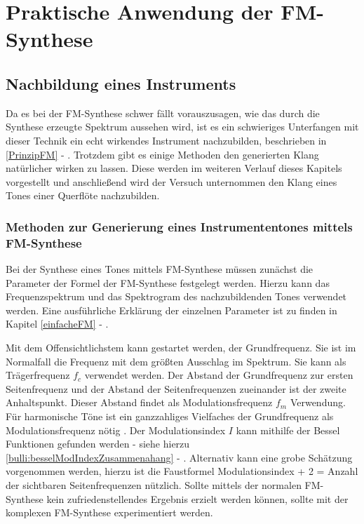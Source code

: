 \section{Praktische Anwendung der FM-Synthese}
\FloatBarrier
\subsection{Nachbildung eines Instruments}
Da es bei der FM-Synthese schwer fällt vorauszusagen, wie das durch die Synthese erzeugte Spektrum aussehen wird, ist es ein schwieriges Unterfangen mit dieser Technik ein echt wirkendes Instrument nachzubilden, beschrieben in \ref{PrinzipFM} - .
Trotzdem gibt es einige Methoden den generierten Klang natürlicher wirken zu lassen. Diese werden im weiteren Verlauf dieses Kapitels vorgestellt und anschließend wird der Versuch unternommen den Klang eines Tones einer Querflöte nachzubilden.

\FloatBarrier
\subsubsection{Methoden zur Generierung eines Instrumententones mittels FM-Synthese}

Bei der Synthese eines Tones mittels FM-Synthese müssen zunächst die Parameter der Formel der FM-Synthese festgelegt werden. Hierzu kann das Frequenzspektrum und das Spektrogram des nachzubildenden Tones verwendet werden. Eine ausführliche Erklärung der einzelnen Parameter ist zu finden in Kapitel \ref{einfacheFM} - . 

Mit dem Offensichtlichstem kann gestartet werden, der Grundfrequenz. Sie ist im Normalfall die Frequenz mit dem größten Ausschlag im Spektrum. Sie kann als Trägerfrequenz $f_c$ verwendet werden. Der Abstand der Grundfrequenz zur ersten Seitenfrequenz und der Abstand der Seitenfrequenzen zueinander ist der zweite Anhaltspunkt. Dieser Abstand findet als Modulationsfrequenz $f_m$ Verwendung. Für harmonische Töne ist ein ganzzahliges Vielfaches der Grundfrequenz als Modulationsfrequenz nötig \cite[S. 528]{chowningPaper}. Der Modulationsindex $I$ kann mithilfe der Bessel Funktionen gefunden werden - siehe hierzu \ref{bulli:besselModIndexZusammenahang} - . Alternativ kann eine grobe Schätzung vorgenommen werden, hierzu ist die Faustformel Modulationsindex + 2 = Anzahl der sichtbaren Seitenfrequenzen nützlich. Sollte mittels der normalen FM-Synthese kein zufriedenstellendes Ergebnis erzielt werden können, sollte mit der komplexen FM-Synthese experimentiert werden. 

